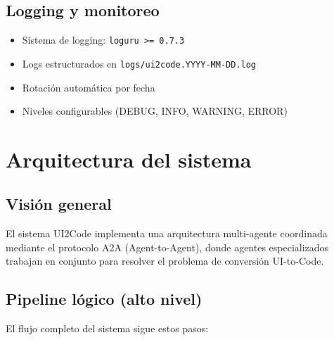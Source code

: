 \documentclass[12pt,a4paper]{article}
\begin{document}
\subsection{Logging y monitoreo}
\begin{itemize}
    \item Sistema de logging: \texttt{loguru >= 0.7.3}
    \item Logs estructurados en \texttt{logs/ui2code.YYYY-MM-DD.log}
    \item Rotación automática por fecha
    \item Niveles configurables (DEBUG, INFO, WARNING, ERROR)
\end{itemize}

\section{Arquitectura del sistema}

\subsection{Visión general}

El sistema UI2Code implementa una arquitectura multi-agente coordinada mediante el protocolo A2A (Agent-to-Agent), donde agentes especializados trabajan en conjunto para resolver el problema de conversión UI-to-Code.

\subsection{Pipeline lógico (alto nivel)}

El flujo completo del sistema sigue estos pasos:
\end{document}
